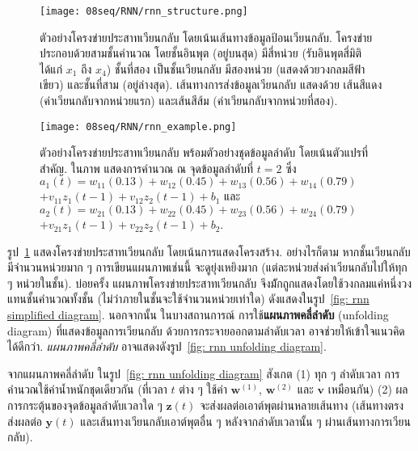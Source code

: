 %
\begin{figure}
	\begin{center}
		\texttt{[image: 08seq/RNN/rnn\_structure.png]}	
		
		\caption[ตัวอย่างโครงข่ายประสาทเวียนกลับ]{ตัวอย่างโครงข่ายประสาทเวียนกลับ โดยเน้นเส้นทางข้อมูลป้อนเวียนกลับ.
โครงข่ายประกอบด้วยสามชั้นคำนวณ 
โดยชั้นอินพุต (อยู่บนสุด) มีสี่หน่วย (รับอินพุตสี่มิติ ได้แก่ $x_1$ ถึง $x_4$)
ชั้นที่สอง เป็นชั้นเวียนกลับ มีสองหน่วย (แสดงด้วยวงกลมสีฟ้าเขียว)
และชั้นที่สาม (อยู่ล่างสุด).
เส้นทางการส่งข้อมูลเวียนกลับ แสดงด้วย เส้นสีแดง (ค่าเวียนกลับจากหน่วยแรก) และเส้นสีส้ม (ค่าเวียนกลับจากหน่วยที่สอง).
	}
		\label{fig: rnn}
	\end{center}
\end{figure}
%

\begin{figure}
	\begin{center}

		\texttt{[image: 08seq/RNN/rnn\_example.png]}	
		\caption[ตัวอย่างโครงข่ายประสาทเวียนกลับ พร้อมตัวอย่างชุดข้อมูลลำดับ]{ตัวอย่างโครงข่ายประสาทเวียนกลับ พร้อมตัวอย่างชุดข้อมูลลำดับ โดยเน้นตัวแปรที่สำคัญ.
ในภาพ แสดงการคำนวณ ณ จุดข้อมูลลำดับที่ $t=2$
ซึ่ง $a_1(t) = w_{11} (0.13) + w_{12} (0.45) + w_{13} (0.56) + w_{14} (0.79)$
$+ v_{11} z_1(t-1) + v_{12} z_2(t-1) + b_1$
และ $a_2(t) = w_{21} (0.13) + w_{22} (0.45) + w_{23} (0.56) + w_{24} (0.79)$
$+ v_{21} z_1(t-1) + v_{22} z_2(t-1) + b_2$.}
\label{fig: rnn example}
\end{center}
\end{figure}
%

รูป~\ref{fig: rnn}
แสดงโครงข่ายประสาทเวียนกลับ โดยเน้นการแสดงโครงสร้าง.
อย่างไรก็ตาม หากชั้นเวียนกลับมีจำนวนหน่วยมาก ๆ 
การเขียนแผนภาพเช่นนี้ จะดูยุ่งเหยิงมาก
(แต่ละหน่วยส่งค่าเวียนกลับไปให้ทุก ๆ หน่วยในชั้น).
บ่อยครั้ง แผนภาพโครงข่ายประสาทเวียนกลับ
จึงม้ักถูกแสดงโดยใช้วงกลมแค่หนึ่งวงแทนชั้นคำนวณทั้งชั้น (ไม่ว่าภายในชั้นจะใช้จำนวนหน่วยเท่าใด)
ดังแสดงในรูป~\ref{fig: rnn simplified diagram}.
นอกจากนั้น ในบางสถานการณ์
การใช้\textbf{แผนภาพคลี่ลำดับ} (unfolding diagram) 
ที่แสดงข้อมูลการเวียนกลับ
ด้วยการกระจายออกตามลำดับเวลา
อาจช่วยให้เข้าใจแนวคิดได้ดีกว่า.
\textit{แผนภาพคลี่ลำดับ}
อาจแสดงดังรูป~\ref{fig: rnn unfolding diagram}.

จากแผนภาพคลี่ลำดับ ในรูป~\ref{fig: rnn unfolding diagram} สังเกต
(1) ทุก ๆ ลำดับเวลา การคำนวณใช้ค่าน้ำหนักชุดเดียวกัน 
(ที่เวลา $t$ ต่าง ๆ ใช้ค่า $\bm{w}^{(1)}$,
$\bm{w}^{(2)}$ และ $\bm{v}$ เหมือนกัน)
(2) ผลการกระตุ้นของจุดข้อมูลลำดับเวลาใด ๆ $\bm{z}(t)$ จะส่งผลต่อเอาต์พุตผ่านหลายเส้นทาง 
(เส้นทางตรง ส่งผลต่อ $\bm{y}(t)$ 
และเส้นทางเวียนกลับเอาต์พุตอื่น ๆ หลังจากลำดับเวลานั้น ๆ ผ่านเส้นทางการเวียนกลับ). 




